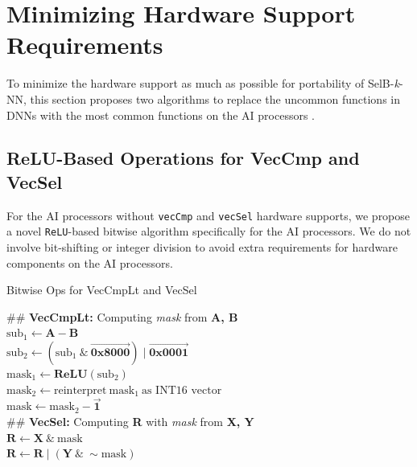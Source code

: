 \documentclass[12pt]{extbook}
\begin{document}
\section{Minimizing Hardware Support Requirements}

To minimize the hardware support as much as possible for portability of SelB-\textit{k}-NN, this section proposes two algorithms to replace the uncommon functions in DNNs with the most common functions on the AI processors \cite{cambricon, CANN, jax}.

\subsection{ReLU-Based Operations for VecCmp and VecSel \label{sec:relu}}

For the AI processors without \verb|vecCmp| and \verb|vecSel| hardware supports, we propose a novel \verb|ReLU|-based bitwise algorithm specifically for the AI processors. We do not involve bit-shifting or integer division to avoid extra requirements for hardware components on the AI processors.
    
\begin{algorithm}[tbp]
    \caption{Bitwise Ops for VecCmpLt and VecSel}
    \label{alg:bit_hack}
            
            
                
    \BlankLine
    \#\# \textbf{VecCmpLt:} Computing \textit{mask} from \textbf{A, B} \\
    $\text{sub}_{1} \leftarrow \textbf{A} - \textbf{B}$ \\
    $\text{sub}_{2} \leftarrow (\text{sub}_{1} \  \& \  \vec{\textbf{0x8000}}) \mid \vec{\textbf{0x0001}}$ \\
    $\text{mask}_{1} \leftarrow \textbf{ReLU}(\text{sub}_{2})$ \\
    $\text{mask}_{2} \leftarrow \text{reinterpret} \  \text{mask}_{1} \  \text{as INT16 vector}$ \\
    $\text{mask} \leftarrow \text{mask}_{2} - \vec{\textbf{1}}$ \\
    
    \BlankLine
    \#\# \textbf{VecSel:} Computing \textbf{R} with \textit{mask} from \textbf{X, Y}\\
    $\textbf{R} \leftarrow \textbf{X} \ \&\ \text{mask}$ \\
    $\textbf{R} \leftarrow \textbf{R} \mid (\textbf{Y} \ \&\ \sim \text{mask})$ \\
\end{algorithm}
    
\end{document}
